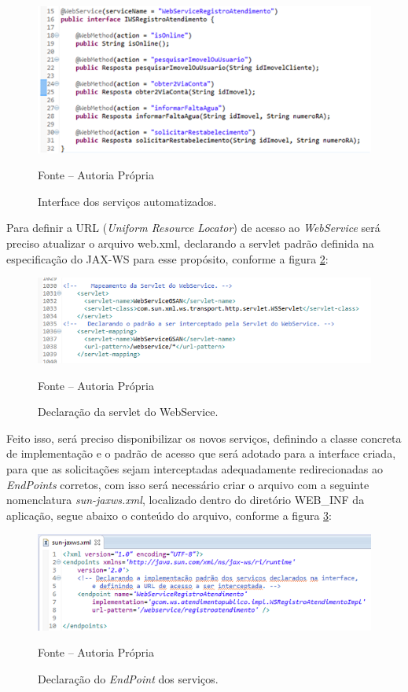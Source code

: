 \begin{figure}[!htb]
	\centering
	\includegraphics{figuras/implementacao_servicos.png}
	\caption{Interface dos serviços automatizados.}	
	\label{figura:interfaceServicosAutomatizados}
	Fonte – Autoria Própria
\end{figure}


Para definir a URL (\textit{Uniform Resource Locator}) de acesso ao \textit{WebService} será preciso atualizar o arquivo web.xml, declarando a servlet padrão definida na especificação do JAX-WS para esse propósito, conforme a figura \ref{figura:declaracaoServlet}:

\begin{figure}[!htb]
	\centering
	\includegraphics{figuras/declarando_servlet.png}
	\caption{Declaração da servlet do WebService.}	
	\label{figura:declaracaoServlet}
	Fonte – Autoria Própria
\end{figure}


Feito isso, será preciso disponibilizar os novos serviços, definindo a classe concreta de implementação e o padrão de acesso que será adotado para a interface criada, para que as solicitações sejam interceptadas adequadamente redirecionadas ao \textit{EndPoints} corretos, com isso será necessário criar o arquivo com a seguinte nomenclatura \textit{sun-jaxws.xml}, localizado dentro do diretório WEB\_INF da aplicação, segue abaixo o conteúdo do arquivo, conforme a figura \ref{figura:declaracaoEndPoint}:

\begin{figure}[!htb]
	\centering
	\includegraphics{figuras/declaracao_endpoint.png}
	\caption{Declaração do \textit{EndPoint} dos serviços.}	
	\label{figura:declaracaoEndPoint}
	Fonte – Autoria Própria
\end{figure}

